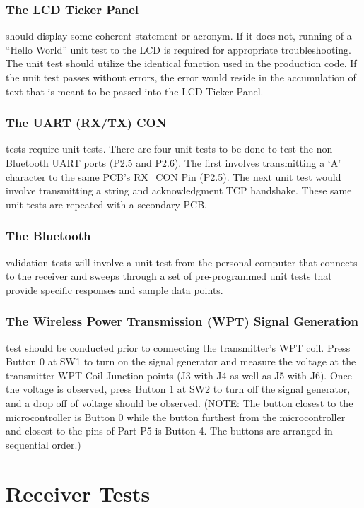 \documentclass[12pt]{article}
\begin{document}
\subsubsection*{The LCD Ticker Panel} should display some coherent statement or acronym.  If it does not, running of a “Hello World” unit test to the LCD is required for appropriate troubleshooting.  The unit test should utilize the identical function used in the production code.  If the unit test passes without errors, the error would reside in the accumulation of text that is meant to be passed into the LCD Ticker Panel.

\subsubsection*{The UART (RX/TX) CON} tests require unit tests. There are four unit tests to be done to test the non-Bluetooth UART ports (P2.5 and P2.6).  The first involves transmitting a ‘A’ character to the same PCB’s RX\_CON Pin (P2.5).  The next unit test would involve transmitting a string and acknowledgment TCP handshake.  These same unit tests are repeated with a secondary PCB.

\subsubsection*{The Bluetooth} validation tests will involve a unit test from the personal computer that connects to the receiver and sweeps through a set of pre-programmed unit tests that provide specific responses and sample data points.

\subsubsection*{The Wireless Power Transmission (WPT) Signal Generation} test should be conducted prior to connecting the transmitter's WPT coil.  Press Button 0 at SW1 to turn on the signal generator and measure the voltage at the transmitter WPT Coil Junction points (J3 with J4 as well as J5 with J6).  Once the voltage is observed, press Button 1 at SW2 to turn off the signal generator, and a drop off of voltage should be observed. (NOTE: The button closest to the microcontroller is Button 0 while the button furthest from the microcontroller and closest to the pins of Part P5 is Button 4. The buttons are arranged in sequential order.)
\hfill
\pagebreak
\section*{Receiver Tests}  %
\end{document}
